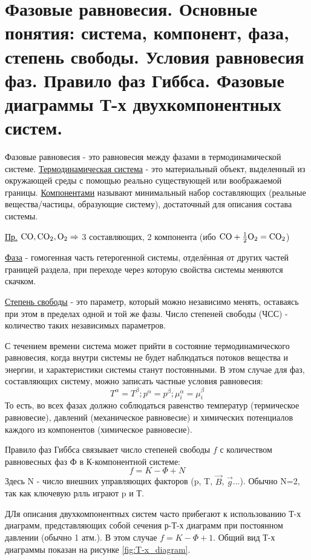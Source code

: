 \section{Фазовые равновесия. Основные понятия: система, компонент, фаза,
степень свободы. Условия равновесия фаз. Правило фаз Гиббса. Фазовые
диаграммы Т-х двухкомпонентных систем.}
Фазовые равновесия - это равновесия между фазами в термодинамической системе. \underline{Термодинамическая система} - это материальный объект, выделенный из окружающей среды с помощью реально существующей или воображаемой границы. \underline{Компонентами} называют минимальный набор составляющих (реальные вещества/частицы, образующие систему), достаточный для описания состава системы.
\par
\underline{Пр.} $\rm CO, CO_2, O_2 \Rightarrow$ 3 составляющих, 2 компонента (ибо $\rm CO + \frac{1}{2}O_2=CO_2$)
\par
\underline{Фаза} - гомогенная часть гетерогенной системы, отделённая от других частей границей раздела, при переходе через которую свойства системы меняются скачком. \par
\underline{Степень свободы} - это параметр, который можно независимо менять, оставаясь при этом в пределах одной и той же фазы. Число степеней свободы (ЧСС) - количество таких независимых параметров.
\par С течением времени система может прийти в состояние термодинамического равновесия, когда внутри системы  не будет наблюдаться потоков вещества и энергии, и характеристики системы станут постоянными. В этом случае для фаз, составляющих систему, можно записать частные условия равновесия:
\begin{equation}
T^\alpha=T^\beta; p^\alpha = p^\beta; \mu_i^\alpha = \mu_i^\beta
\label{eq:partial_equilibrium_conditions}  
\end{equation}
То есть, во всех фазах должно соблюдаться равенство температур (термическое равновесие), давлений (механическое равновесие) и химических потенциалов каждого из компонентов (химическое равновесие). 
\par Правило фаз Гиббса связывает число степеней свободы $f$ с количеством равновесных фаз Ф в К-компонентной системе:
\begin{equation}
f=K-\Phi+N
\label{eq:Gibbs_rule}  
\end{equation}
Здесь N - число внешних управляющих факторов (p, T, $\vec{B}$, $\vec{g}$...). Обычно N=2, так как ключевую рлль играют p и Т.
\par ДЛя описания двухкомпонентных систем часто прибегают к использованию Т-х диаграмм, представляющих собой сечения р-Т-х диаграмм при постоянном давлении (обычно 1 атм.). В этом случае $f=K-\Phi+1$. Общий вид Т-х диаграммы показан на рисунке \ref{fig:T-x_diagram}.
